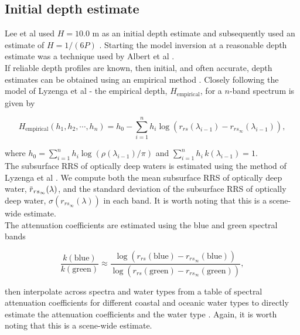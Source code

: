 \documentclass[12pt]{article}
\newcommand{\overbar}[1]{\mkern 1.5mu\overline{\mkern-1.5mu#1\mkern-1.5mu}\mkern 1.5mu}
\numberwithin{equation}{section}
\begin{document}
	\subsection{Initial depth estimate}\label{lyzenga_method}

Lee et al \cite{lee1999} used $H = 10.0$ m as an initial depth estimate and subsequently 
used an estimate of $H = 1/(6P)$ \cite{dekker2011}. Starting the model inversion at a 
reasonable depth estimate was a technique used by Albert et al \cite{albert2006}. \\

If reliable depth profiles are known, then initial, and often accurate, depth estimates 
can be obtained using an empirical method \cite{polycn1976}\cite{lyzenga1978}\cite{lyzenga2006}. 
Closely following the model of Lyzenga et al \cite{lyzenga2006} - the empirical depth, 
$H_{\text{empirical}}$, for a $n$-band spectrum is given by 
\begin{linenomath}
\begin{equation*}
H_{\text{empirical}}\left(h_1,h_2,\cdots,h_n\right) = h_0 - \sum_{i=1}^{n} h_i \log(r_{rs}(\lambda_{i-1}) - r_{rs_{\infty}}(\lambda_{i-1})),
\end{equation*}
\end{linenomath}
where $h_0 = \sum\limits_{i=1}^n h_i \log(\rho(\lambda_{i-1})/\pi)$ and $\sum\limits_{i=1}^n h_i\, k(\lambda_{i-1}) = 1$.\\

The subsurface RRS of optically deep waters is estimated using the method of Lyzenga 
et al \cite{lyzenga2006}. We compute both the mean subsurface RRS of optically deep 
water, $\overbar{r}_{rs_\infty}(\lambda)$, and the standard deviation of the subsurface 
RRS of optically deep water, $\sigma\left(r_{rs_\infty}(\lambda)\right)$ in each 
band. It is worth noting that this is a scene-wide estimate. \\

The attenuation coefficients are estimated using the blue and green spectral bands  
\begin{linenomath}
\begin{equation*}
\frac{k(\text{blue})}{k(\text{green})} \approx \frac{\log\left(r_{rs}(\text{blue}) - r_{rs_{\infty}}(\text{blue})\right)}{\log\left(r_{rs}(\text{green}) - r_{rs_{\infty}}(\text{green})\right)},
\end{equation*}
\end{linenomath}
then interpolate across spectra and water types from a table of spectral attenuation 
coefficients for different coastal and oceanic water types to directly estimate the 
attenuation coefficients and the water type \cite{jerlov1968}\cite{morel1998}. Again, 
it is worth noting that this is a scene-wide estimate. \\
\end{document}
